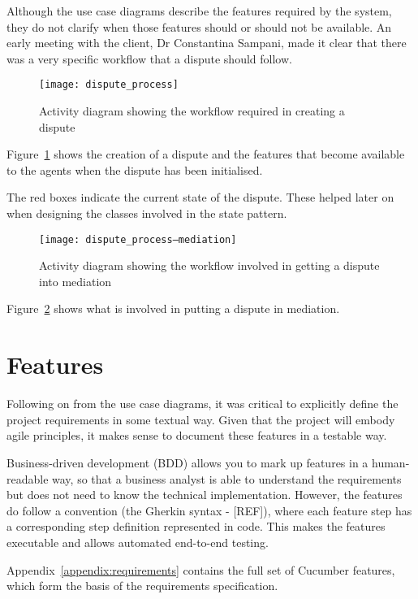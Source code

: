 Although the use case diagrams describe the features required by the system, they do not clarify when those features should or should not be available. An early meeting with the client, Dr Constantina Sampani, made it clear that there was a very specific workflow that a dispute should follow.

\begin{figure}[h!]
  \centering
    \ifimages
    \texttt{[image: dispute\_process]}
    \fi
  \caption{Activity diagram showing the workflow required in creating a dispute}
  \label{uml:activity:dispute}
\end{figure}

Figure~\ref{uml:activity:dispute} shows the creation of a dispute and the features that become available to the agents when the dispute has been initialised.

The red boxes indicate the current state of the dispute. These helped later on when designing the classes involved in the state pattern.

\begin{figure}[h!]
  \centering
    \ifimages
    \texttt{[image: dispute\_process--mediation]}
    \fi
  \caption{Activity diagram showing the workflow involved in getting a dispute into mediation}
  \label{uml:activity:mediation}
\end{figure}

Figure~\ref{uml:activity:mediation} shows what is involved in putting a dispute in mediation.

\section{Features}

Following on from the use case diagrams, it was critical to explicitly define the project requirements in some textual way. Given that the project will embody agile principles, it makes sense to document these features in a testable way.

Business-driven development (BDD) allows you to mark up features in a human-readable way, so that a business analyst is able to understand the requirements but does not need to know the technical implementation. However, the features do follow a convention (the Gherkin syntax - [REF]), where each feature step has a corresponding step definition represented in code. This makes the features executable and allows automated end-to-end testing.

Appendix~\ref{appendix:requirements} contains the full set of Cucumber features, which form the basis of the requirements specification.

